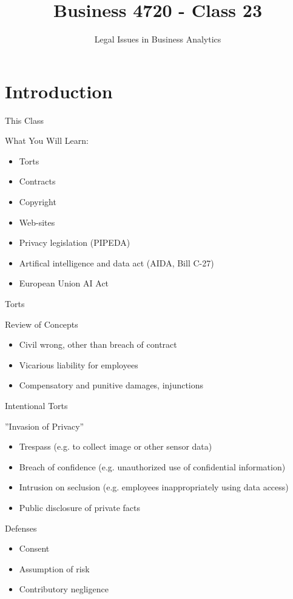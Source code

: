 \documentclass[ignorenonframetext,xcolor=x11names]{beamer}
\title{Business 4720 - Class 23}
\subtitle{Legal Issues in Business Analytics}
\begin{document}
\begin{frame}{}
  \titlepage
  \footnotesize
  
\end{frame}

\section{Introduction}

\begin{frame}{This Class}
\begin{block}{What You Will Learn:}
\begin{itemize}
  \item Torts 
  \item Contracts 
  \item Copyright 
  \item Web-sites 
  \item Privacy legislation (PIPEDA)
  \item Artifical intelligence and data act (AIDA, Bill C-27)
  \item European Union AI Act
\end{itemize}
\end{block}
\end{frame}

\begin{frame}{Torts}
\begin{block}{Review of Concepts}
  \begin{itemize}
     \item Civil wrong, other than breach of contract
     \item Vicarious liability for employees
     \item Compensatory and punitive damages, injunctions
  \end{itemize}
\end{block}
\end{frame}

\begin{frame}{Intentional Torts}
\begin{block}{''Invasion of Privacy''}
  \begin{itemize}
     \item Trespass (e.g. to collect image or other sensor data)
     \item Breach of confidence (e.g. unauthorized use of confidential information)
     \item Intrusion on seclusion  (e.g. employees inappropriately using data access)
     \item Public disclosure of private facts
  \end{itemize}
\end{block}  
\begin{block}{Defenses}
  \begin{itemize}
     \item Consent
     \item Assumption of risk
     \item Contributory negligence
  \end{itemize}
\end{block}
\end{frame}
\end{document}

